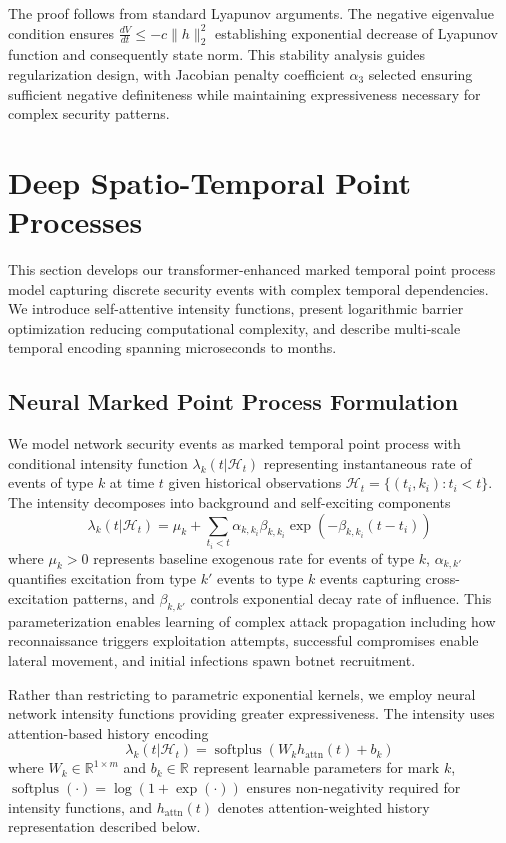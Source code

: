 \documentclass[10pt,journal,compsoc]{IEEEtran}
\newcommand{\R}{\mathbb{R}}
\newcommand{\softplus}{\operatorname{softplus}}
\begin{document}
The proof follows from standard Lyapunov arguments. The negative eigenvalue condition ensures $\frac{dV}{dt} \leq -c\|h\|_2^2$ establishing exponential decrease of Lyapunov function and consequently state norm. This stability analysis guides regularization design, with Jacobian penalty coefficient $\alpha_3$ selected ensuring sufficient negative definiteness while maintaining expressiveness necessary for complex security patterns.

\section{Deep Spatio-Temporal Point Processes}
\label{sec:point_processes}

This section develops our transformer-enhanced marked temporal point process model capturing discrete security events with complex temporal dependencies. We introduce self-attentive intensity functions, present logarithmic barrier optimization reducing computational complexity, and describe multi-scale temporal encoding spanning microseconds to months.

\subsection{Neural Marked Point Process Formulation}

We model network security events as marked temporal point process with conditional intensity function $\lambda_k(t | \mathcal{H}_t)$ representing instantaneous rate of events of type $k$ at time $t$ given historical observations $\mathcal{H}_t = \{(t_i, k_i) : t_i < t\}$. The intensity decomposes into background and self-exciting components
\begin{equation}
\lambda_k(t | \mathcal{H}_t) = \mu_k + \sum_{t_i < t} \alpha_{k,k_i} \beta_{k,k_i} \exp(-\beta_{k,k_i}(t - t_i))
\label{eq:hawkes_intensity}
\end{equation}
where $\mu_k > 0$ represents baseline exogenous rate for events of type $k$, $\alpha_{k,k'}$ quantifies excitation from type $k'$ events to type $k$ events capturing cross-excitation patterns, and $\beta_{k,k'}$ controls exponential decay rate of influence. This parameterization enables learning of complex attack propagation including how reconnaissance triggers exploitation attempts, successful compromises enable lateral movement, and initial infections spawn botnet recruitment.

Rather than restricting to parametric exponential kernels, we employ neural network intensity functions providing greater expressiveness. The intensity uses attention-based history encoding
\begin{equation}
\lambda_k(t | \mathcal{H}_t) = \softplus\left(W_k h_{\text{attn}}(t) + b_k\right)
\end{equation}
where $W_k \in \R^{1 \times m}$ and $b_k \in \R$ represent learnable parameters for mark $k$, $\softplus(\cdot) = \log(1 + \exp(\cdot))$ ensures non-negativity required for intensity functions, and $h_{\text{attn}}(t)$ denotes attention-weighted history representation described below.
\end{document}
